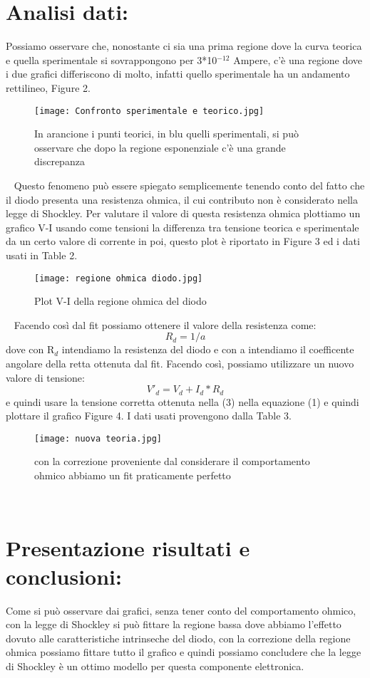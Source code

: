 \documentclass{article}
\begin{document}
\section{Analisi dati:}
Possiamo osservare che, nonostante ci sia una prima regione dove la curva teorica e quella sperimentale si sovrappongono per 3*10$^{-12}$ Ampere, c'è una regione dove i due grafici differiscono di molto, infatti quello sperimentale ha un andamento rettilineo, Figure 2.
~
\begin{figure}[h!]
    \centering
    \texttt{[image: Confronto sperimentale e teorico.jpg]}
    \caption{In arancione i punti teorici, in blu quelli sperimentali, si può osservare che dopo la regione esponenziale c'è una grande discrepanza}
    \label{figura1}
\end{figure}
~
Questo fenomeno può  essere spiegato semplicemente tenendo conto del fatto che il diodo presenta una resistenza ohmica, il cui contributo non è considerato nella legge di Shockley. Per valutare il valore di questa resistenza ohmica plottiamo un grafico V-I usando come tensioni la differenza tra tensione teorica e sperimentale da un certo valore di corrente in poi, questo plot è riportato in Figure 3 ed i dati usati in Table 2.
~
\begin{figure}[h!]
    \centering
    \texttt{[image: regione ohmica diodo.jpg]}
    \caption{Plot V-I della regione ohmica del diodo}
    \label{figura1}
\end{figure}
~
Facendo così dal fit possiamo ottenere il valore della resistenza come:
\begin{equation}
    R_d=1/a
\end{equation}
dove con R$_{d}$ intendiamo la resistenza del diodo e con a intendiamo il coefficente angolare della retta ottenuta dal fit. Facendo così, possiamo utilizzare un nuovo valore di tensione:
\begin{equation}
    V'_d=V_d+I_d*R_d
\end{equation}
e quindi usare la tensione corretta ottenuta nella (3) nella equazione (1) e quindi plottare il grafico Figure 4. I dati usati provengono dalla Table 3.
~
\begin{figure}[h!]
    \centering
    \texttt{[image: nuova teoria.jpg]}
    \caption{con la correzione proveniente dal considerare il comportamento ohmico abbiamo un fit praticamente perfetto}
    \label{figura1}
\end{figure}
~
\section{Presentazione risultati e conclusioni:}
Come si può osservare dai grafici, senza tener conto del comportamento ohmico, con la legge di Shockley si può fittare la regione bassa dove abbiamo l'effetto dovuto alle caratteristiche intrinseche del diodo, con la correzione della regione ohmica possiamo fittare tutto il grafico e quindi possiamo concludere che la legge di Shockley è un ottimo modello per questa componente elettronica.
~
\end{document}
